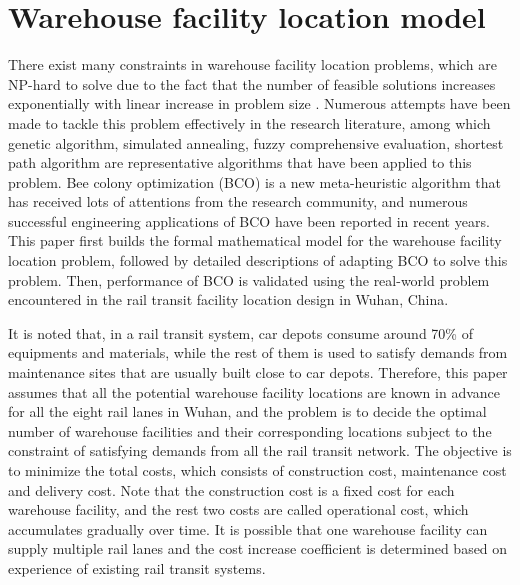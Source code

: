 \section{Warehouse facility location model}
There exist many constraints in warehouse facility location problems\citep{c1, c2}, which are NP-hard to solve due to the fact that the number of feasible solutions increases exponentially with linear increase in problem size \citep{c3}.
Numerous attempts have been made to tackle this problem effectively in the research literature, among which genetic algorithm, simulated annealing, fuzzy comprehensive evaluation, shortest path algorithm are representative algorithms that have been applied to this problem.
Bee colony optimization (BCO) \citep{c4} is a new meta-heuristic algorithm that has received lots of attentions from the research community, and numerous successful engineering applications of BCO have been reported in recent years.
This paper first builds the formal mathematical model for the warehouse facility location problem, followed by detailed descriptions of adapting BCO to solve this problem.
Then, performance of BCO is validated using the real-world problem encountered in the rail transit facility location design in Wuhan, China.

It is noted that, in a rail transit system, car depots consume around 70\% of equipments and materials, while the rest of them is used to satisfy demands from maintenance sites that are usually built close to car depots.
Therefore, this paper assumes that all the potential warehouse facility locations are known in advance for all the eight rail lanes in Wuhan, and the problem is to decide the optimal number of warehouse facilities and their corresponding locations subject to the constraint of satisfying demands from all the rail transit network.
The objective is to minimize the total costs, which consists of construction cost, maintenance cost and delivery cost.
Note that the construction cost is a fixed cost for each warehouse facility, and the rest two costs are called operational cost, which accumulates gradually over time.
It is possible that one warehouse facility can supply multiple rail lanes and the cost increase coefficient is determined based on experience of existing rail transit systems.

